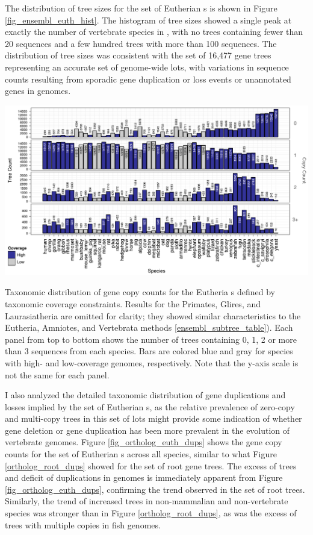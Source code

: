 The distribution of tree sizes for the set of Eutherian \subtr{}s is
shown in Figure \ref{fig_ensembl_euth_hist}. The histogram of tree sizes
showed a single peak at exactly the number of vertebrate species in
\ens, with no trees containing fewer than 20 sequences and a few
hundred trees with more than 100 sequences. The distribution of tree
sizes was consistent with the set of 16,477 gene trees representing an
accurate set of genome-wide \mammln \acp{lot}, with variations in
sequence counts resulting from sporadic gene duplication or loss
events or unannotated genes in \lcv genomes.

\bbfig
\centering
\includegraphics[scale=0.83]{Figs/dups_euth_roots.pdf}
\caption{Taxonomic distribution of gene copy counts for the Eutheria
  \subtr{}s defined by taxonomic coverage constraints. Results for the
  Primates, Glires, and Laurasiatheria are omitted for clarity; they
  showed similar characteristics to the Eutheria, Amniotes, and
  Vertebrata methods \ref{ensembl_subtree_table}). Each panel from top
  to bottom shows the number of trees containing 0, 1, 2 or more than
  3 sequences from each species. Bars are colored blue and gray for
  species with high- and low-coverage genomes, respectively. Note that
  the y-axis scale is not the same for each panel.}
\label{fig_ortholog_euth_dups}
\eefig

I also analyzed the detailed taxonomic distribution of gene
duplications and losses implied by the set of Eutherian \subtr{}s, as
the relative prevalence of zero-copy and multi-copy trees in this set
of \acp{lot} might provide some indication of whether gene deletion or
gene duplication has been more prevalent in the evolution of
vertebrate genomes. Figure \ref{fig_ortholog_euth_dups} shows the gene
copy counts for the set of Eutherian \subtr{}s across all \ens
species, similar to what Figure \ref{ortholog_root_dups} showed for
the set of root \cmp gene trees. The excess of \zcop trees and deficit
of duplications in \lcv genomes is immediately apparent from Figure
\ref{fig_ortholog_euth_dups}, confirming the trend observed in the set
of root \cmp trees. Similarly, the trend of increased \zcop trees in
non-mammalian and non-vertebrate species was stronger than in Figure
\ref{ortholog_root_dups}, as was the excess of trees with multiple
copies in fish genomes.


